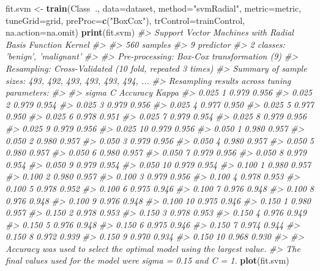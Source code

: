 \documentclass[]{book}
\newenvironment{Shaded}{\begin{snugshade}}{\end{snugshade}}
\newcommand{\CommentTok}[1]{\textcolor[rgb]{0.56,0.35,0.01}{\textit{#1}}}
\newcommand{\DataTypeTok}[1]{\textcolor[rgb]{0.13,0.29,0.53}{#1}}
\newcommand{\KeywordTok}[1]{\textcolor[rgb]{0.13,0.29,0.53}{\textbf{#1}}}
\newcommand{\NormalTok}[1]{#1}
\newcommand{\OperatorTok}[1]{\textcolor[rgb]{0.81,0.36,0.00}{\textbf{#1}}}
\newcommand{\StringTok}[1]{\textcolor[rgb]{0.31,0.60,0.02}{#1}}
\begin{document}
\begin{Shaded}
\begin{Highlighting}[]
\NormalTok{fit.svm <-}\StringTok{ }\KeywordTok{train}\NormalTok{(Class}\OperatorTok{~}\NormalTok{., }\DataTypeTok{data=}\NormalTok{dataset, }\DataTypeTok{method=}\StringTok{"svmRadial"}\NormalTok{, }\DataTypeTok{metric=}\NormalTok{metric, }
                 \DataTypeTok{tuneGrid=}\NormalTok{grid, }
                 \DataTypeTok{preProc=}\KeywordTok{c}\NormalTok{(}\StringTok{"BoxCox"}\NormalTok{), }\DataTypeTok{trControl=}\NormalTok{trainControl, }
                 \DataTypeTok{na.action=}\NormalTok{na.omit)}
\KeywordTok{print}\NormalTok{(fit.svm)}
\CommentTok{#> Support Vector Machines with Radial Basis Function Kernel }
\CommentTok{#> }
\CommentTok{#> 560 samples}
\CommentTok{#>   9 predictor}
\CommentTok{#>   2 classes: 'benign', 'malignant' }
\CommentTok{#> }
\CommentTok{#> Pre-processing: Box-Cox transformation (9) }
\CommentTok{#> Resampling: Cross-Validated (10 fold, repeated 3 times) }
\CommentTok{#> Summary of sample sizes: 493, 492, 493, 493, 493, 494, ... }
\CommentTok{#> Resampling results across tuning parameters:}
\CommentTok{#> }
\CommentTok{#>   sigma  C   Accuracy  Kappa}
\CommentTok{#>   0.025   1  0.979     0.956}
\CommentTok{#>   0.025   2  0.979     0.954}
\CommentTok{#>   0.025   3  0.979     0.956}
\CommentTok{#>   0.025   4  0.977     0.950}
\CommentTok{#>   0.025   5  0.977     0.950}
\CommentTok{#>   0.025   6  0.978     0.951}
\CommentTok{#>   0.025   7  0.979     0.954}
\CommentTok{#>   0.025   8  0.979     0.956}
\CommentTok{#>   0.025   9  0.979     0.956}
\CommentTok{#>   0.025  10  0.979     0.956}
\CommentTok{#>   0.050   1  0.980     0.957}
\CommentTok{#>   0.050   2  0.980     0.957}
\CommentTok{#>   0.050   3  0.979     0.956}
\CommentTok{#>   0.050   4  0.980     0.957}
\CommentTok{#>   0.050   5  0.980     0.957}
\CommentTok{#>   0.050   6  0.980     0.957}
\CommentTok{#>   0.050   7  0.979     0.956}
\CommentTok{#>   0.050   8  0.979     0.954}
\CommentTok{#>   0.050   9  0.979     0.954}
\CommentTok{#>   0.050  10  0.979     0.954}
\CommentTok{#>   0.100   1  0.980     0.957}
\CommentTok{#>   0.100   2  0.980     0.957}
\CommentTok{#>   0.100   3  0.979     0.956}
\CommentTok{#>   0.100   4  0.978     0.953}
\CommentTok{#>   0.100   5  0.978     0.952}
\CommentTok{#>   0.100   6  0.975     0.946}
\CommentTok{#>   0.100   7  0.976     0.948}
\CommentTok{#>   0.100   8  0.976     0.948}
\CommentTok{#>   0.100   9  0.976     0.948}
\CommentTok{#>   0.100  10  0.975     0.946}
\CommentTok{#>   0.150   1  0.980     0.957}
\CommentTok{#>   0.150   2  0.978     0.953}
\CommentTok{#>   0.150   3  0.978     0.953}
\CommentTok{#>   0.150   4  0.976     0.949}
\CommentTok{#>   0.150   5  0.976     0.948}
\CommentTok{#>   0.150   6  0.975     0.946}
\CommentTok{#>   0.150   7  0.974     0.944}
\CommentTok{#>   0.150   8  0.972     0.939}
\CommentTok{#>   0.150   9  0.970     0.934}
\CommentTok{#>   0.150  10  0.968     0.930}
\CommentTok{#> }
\CommentTok{#> Accuracy was used to select the optimal model using the largest value.}
\CommentTok{#> The final values used for the model were sigma = 0.15 and C = 1.}
\KeywordTok{plot}\NormalTok{(fit.svm)}
\end{Highlighting}
\end{Shaded}
\end{document}
